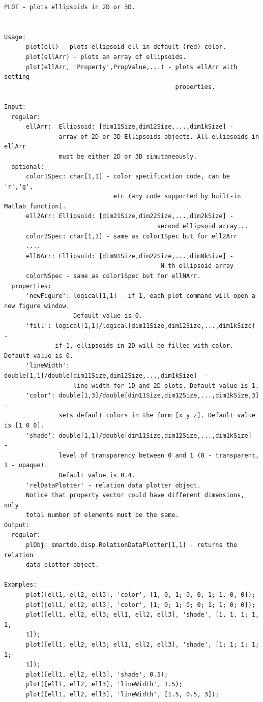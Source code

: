 \documentclass[letterpaper,10pt,english]{sphinxmanual}
\begin{document}
\begin{Verbatim}[commandchars=\\\{\}]
PLOT - plots ellipsoids in 2D or 3D.


Usage:
      plot(ell) - plots ellipsoid ell in default (red) color.
      plot(ellArr) - plots an array of ellipsoids.
      plot(ellArr, 'Property',PropValue,...) - plots ellArr with setting
                                               properties.

Input:
  regular:
      ellArr:  Ellipsoid: [dim11Size,dim12Size,...,dim1kSize] -
               array of 2D or 3D Ellipsoids objects. All ellipsoids in ellArr
               must be either 2D or 3D simutaneously.
  optional:
      color1Spec: char[1,1] - color specification code, can be 'r','g',
                              etc (any code supported by built-in Matlab function).
      ell2Arr: Ellipsoid: [dim21Size,dim22Size,...,dim2kSize] -
                                          second ellipsoid array...
      color2Spec: char[1,1] - same as color1Spec but for ell2Arr
      ....
      ellNArr: Ellipsoid: [dimN1Size,dim22Size,...,dimNkSize] -
                                           N-th ellipsoid array
      colorNSpec - same as color1Spec but for ellNArr.
  properties:
      'newFigure': logical[1,1] - if 1, each plot command will open a new figure window.
                   Default value is 0.
      'fill': logical[1,1]/logical[dim11Size,dim12Size,...,dim1kSize]  -
              if 1, ellipsoids in 2D will be filled with color. Default value is 0.
      'lineWidth': double[1,1]/double[dim11Size,dim12Size,...,dim1kSize]  -
                   line width for 1D and 2D plots. Default value is 1.
      'color': double[1,3]/double[dim11Size,dim12Size,...,dim1kSize,3] -
               sets default colors in the form [x y z]. Default value is [1 0 0].
      'shade': double[1,1]/double[dim11Size,dim12Size,...,dim1kSize]  -
               level of transparency between 0 and 1 (0 - transparent, 1 - opaque).
               Default value is 0.4.
      'relDataPlotter' - relation data plotter object.
      Notice that property vector could have different dimensions, only
      total number of elements must be the same.
Output:
  regular:
      plObj: smartdb.disp.RelationDataPlotter[1,1] - returns the relation
      data plotter object.

Examples:
      plot([ell1, ell2, ell3], 'color', [1, 0, 1; 0, 0, 1; 1, 0, 0]);
      plot([ell1, ell2, ell3], 'color', [1; 0; 1; 0; 0; 1; 1; 0; 0]);
      plot([ell1, ell2, ell3; ell1, ell2, ell3], 'shade', [1, 1, 1; 1, 1,
      1]);
      plot([ell1, ell2, ell3; ell1, ell2, ell3], 'shade', [1; 1; 1; 1; 1;
      1]);
      plot([ell1, ell2, ell3], 'shade', 0.5);
      plot([ell1, ell2, ell3], 'lineWidth', 1.5);
      plot([ell1, ell2, ell3], 'lineWidth', [1.5, 0.5, 3]);
\end{Verbatim}
\end{document}
